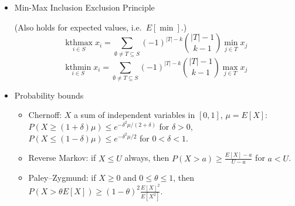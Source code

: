 \begin{itemize}
\item Min-Max Inclusion Exclusion Principle

(Also holds for expected values, i.e.\ $E[\min]$.)
\[
\operatorname*{kthmax}_{i \in S} x_i = \sum_{\emptyset \ne T \subseteq S} (-1)^{|T|-k} \binom{|T|-1}{k-1} \min_{j \in T} x_j
\]
\[
\operatorname*{kthmin}_{i \in S} x_i = \sum_{\emptyset \ne T \subseteq S} (-1)^{|T|-k} \binom{|T|-1}{k-1} \max_{j \in T} x_j
\]
\item Probability bounds
\begin{itemize}
  \item Chernoff: $X$ a sum of independent variables in $[0, 1]$, $\mu = E[X]$: $P(X \ge (1 + \delta)\mu) \le e^{-\delta^2 \mu / (2 + \delta)}$ for $\delta > 0$, $P(X \le (1 - \delta)\mu) \le e^{-\delta^2 \mu / 2}$ for $0 < \delta < 1$.
  \item Reverse Markov: if $X \le U$ always, then $P(X > a) \ge \frac{E[X] - a}{U - a}$ for $a < U$.
  \item Paley--Zygmund: if $X \ge 0$ and $0 \le \theta \le 1$, then $P(X > \theta E[X]) \ge (1 - \theta)^2 \frac{E[X]^2}{E[X^2]}$.
\end{itemize}
\end{itemize}
